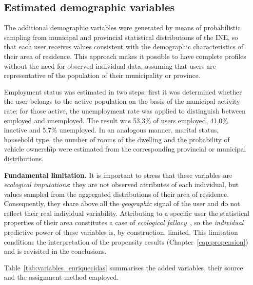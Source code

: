\subsection{Estimated demographic variables}

The additional demographic variables were generated by means of probabilistic sampling from municipal and provincial statistical distributions of the INE, so that each user receives values consistent with the demographic characteristics of their area of residence. This approach makes it possible to have complete profiles without the need for observed individual data, assuming that users are representative of the population of their municipality or province.

Employment status was estimated in two steps: first it was determined whether the user belongs to the active population on the basis of the municipal activity rate; for those active, the unemployment rate was applied to distinguish between employed and unemployed. The result was 53,3\% of users employed, 41,0\% inactive and 5,7\% unemployed. In an analogous manner, marital status, household type, the number of rooms of the dwelling and the probability of vehicle ownership were estimated from the corresponding provincial or municipal distributions.

\textbf{Fundamental limitation.} It is important to stress that these variables are \emph{ecological imputations}: they are not observed attributes of each individual, but values sampled from the aggregated distributions of their area of residence. Consequently, they share above all the \emph{geographic} signal of the user and do not reflect their real individual variability. Attributing to a specific user the statistical properties of their area constitutes a case of \emph{ecological fallacy}~\cite{robinson1950, greenland2001}, so the \emph{individual} predictive power of these variables is, by construction, limited. This limitation conditions the interpretation of the propensity results (Chapter~\ref{cap:propension}) and is revisited in the conclusions.

Table~\ref{tab:variables_enriquecidas} summarises the added variables, their source and the assignment method employed.

